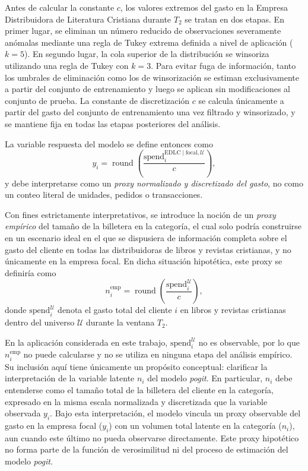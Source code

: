     Antes de calcular la constante \(c\), los valores extremos del gasto en la Empresa Distribuidora de Literatura Cristiana durante \(T_2\) se tratan en dos etapas. En primer lugar, se eliminan un número reducido de observaciones severamente anómalas mediante una regla de Tukey extrema definida a nivel de aplicación (\(k = 5\)). En segundo lugar, la cola superior de la distribución se winsoriza utilizando una regla de Tukey con \(k = 3\). Para evitar fuga de información, tanto los umbrales de eliminación como los de winsorización se estiman exclusivamente a partir del conjunto de entrenamiento y luego se aplican sin modificaciones al conjunto de prueba. La constante de discretización \(c\) se calcula únicamente a partir del gasto del conjunto de entrenamiento una vez filtrado y winsorizado, y se mantiene fija en todas las etapas posteriores del análisis.
    
    La variable respuesta del modelo se define entonces como
    \[
    y_i
    =
    \operatorname{round}\!\left(
    \frac{\mathrm{spend}_{i}^{\mathrm{EDLC}\mid\mathrm{focal},\mathcal{U}}}{c}
    \right),
    \]
    y debe interpretarse como un \emph{proxy normalizado y discretizado del gasto}, no como un conteo literal de unidades, pedidos o transacciones.
    
    Con fines estrictamente interpretativos, se introduce la noción de un \emph{proxy empírico} del tamaño de la billetera en la categoría, el cual solo podría construirse en un escenario ideal en el que se dispusiera de información completa sobre el gasto del cliente en todas las distribuidoras de libros y revistas cristianas, y no únicamente en la empresa focal. En dicha situación hipotética, este proxy se definiría como
    \[
    n_i^{\mathrm{emp}}
    =
    \operatorname{round}\!\left(
    \frac{\mathrm{spend}_{i}^{\mathcal{U}}}{c}
    \right),
    \]
    donde \(\mathrm{spend}_{i}^{\mathcal{U}}\) denota el gasto total del cliente \(i\) en libros y revistas cristianas dentro del universo \(\mathcal{U}\) durante la ventana \(T_2\).
    
    En la aplicación considerada en este trabajo, \(\mathrm{spend}_{i}^{\mathcal{U}}\) no es observable, por lo que \(n_i^{\mathrm{emp}}\) no puede calcularse y no se utiliza en ninguna etapa del análisis empírico. Su inclusión aquí tiene únicamente un propósito conceptual: clarificar la interpretación de la variable latente \(n_i\) del modelo \emph{pogit}. En particular, \(n_i\) debe entenderse como el tamaño total de la billetera del cliente en la categoría, expresado en la misma escala normalizada y discretizada que la variable observada \(y_i\). Bajo esta interpretación, el modelo vincula un proxy observable del gasto en la empresa focal (\(y_i\)) con un volumen total latente en la categoría (\(n_i\)), aun cuando este último no pueda observarse directamente. Este proxy hipotético no forma parte de la función de verosimilitud ni del proceso de estimación del modelo \emph{pogit}.

